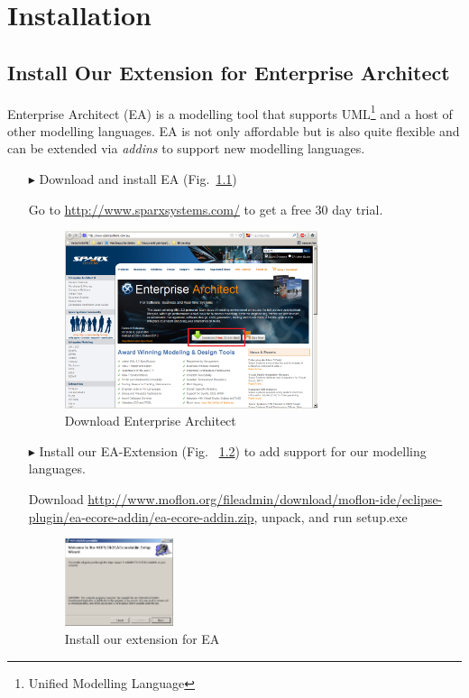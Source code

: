 \chapter{Installation}
\label{chap:installation}

\section{Install Our Extension for Enterprise Architect}
Enterprise Architect (EA) is a modelling tool that supports
UML\footnote{Unified Modelling Language} and a host of other modelling
languages.  EA is not only affordable but is also quite flexible and can be
extended via \emph{addins} to support new modelling languages.
\vspace{-0.1cm}
\begin{enumerate}
\item[$\blacktriangleright$] Download and install EA
(Fig.~\ref{fig_enterpriseArchitextHomepage})
\item[] Go to \url{http://www.sparxsystems.com/} to get a free 30 day trial.
\begin{figure}[!h]
	\centering
  \includegraphics[width=0.7\textwidth]{pics/ea_download.png}
	\caption{Download Enterprise Architect}
	\label{fig_enterpriseArchitextHomepage}
\end{figure} 

\newpage

\item[$\blacktriangleright$] Install our EA-Extension (Fig.~
\ref{fig_eaPluginWizard}) to add support for our modelling languages.
\item[] Download
\url{http://www.moflon.org/fileadmin/download/moflon-ide/eclipse-plugin/ea-ecore-addin/ea-ecore-addin.zip},
unpack, and run setup.exe
\begin{figure}[!h]
	\centering
  \includegraphics[width=0.3\textwidth]{pics/eaplugin_install.png}
	\caption{Install our extension for EA}
	\label{fig_eaPluginWizard}
\end{figure}
\end{enumerate}
\vspace{-1cm}
 
